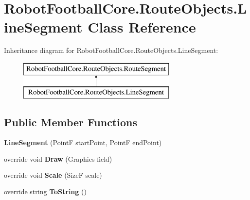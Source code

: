 \hypertarget{class_robot_football_core_1_1_route_objects_1_1_line_segment}{\section{Robot\-Football\-Core.\-Route\-Objects.\-Line\-Segment Class Reference}
\label{class_robot_football_core_1_1_route_objects_1_1_line_segment}
}
Inheritance diagram for Robot\-Football\-Core.\-Route\-Objects.\-Line\-Segment\-:\begin{figure}[H]
\begin{center}
\leavevmode
\includegraphics[height=2.000000cm]{class_robot_football_core_1_1_route_objects_1_1_line_segment}
\end{center}
\end{figure}
\subsection*{Public Member Functions}
\begin{DoxyCompactItemize}
\item 
\hypertarget{class_robot_football_core_1_1_route_objects_1_1_line_segment_ac6eebb8795e59b780f5090b93b8d0dc6}{{\bfseries Line\-Segment} (Point\-F start\-Point, Point\-F end\-Point)}\label{class_robot_football_core_1_1_route_objects_1_1_line_segment_ac6eebb8795e59b780f5090b93b8d0dc6}

\item 
\hypertarget{class_robot_football_core_1_1_route_objects_1_1_line_segment_a88960438e2c60eb709182fbfc86e8f4d}{override void {\bfseries Draw} (Graphics field)}\label{class_robot_football_core_1_1_route_objects_1_1_line_segment_a88960438e2c60eb709182fbfc86e8f4d}

\item 
\hypertarget{class_robot_football_core_1_1_route_objects_1_1_line_segment_abc562b41cf1468c785d52d76f6298df9}{override void {\bfseries Scale} (Size\-F scale)}\label{class_robot_football_core_1_1_route_objects_1_1_line_segment_abc562b41cf1468c785d52d76f6298df9}

\item 
\hypertarget{class_robot_football_core_1_1_route_objects_1_1_line_segment_a4613ff44f6bb61636a17d88d584d3a9c}{override string {\bfseries To\-String} ()}\label{class_robot_football_core_1_1_route_objects_1_1_line_segment_a4613ff44f6bb61636a17d88d584d3a9c}

\end{DoxyCompactItemize}
